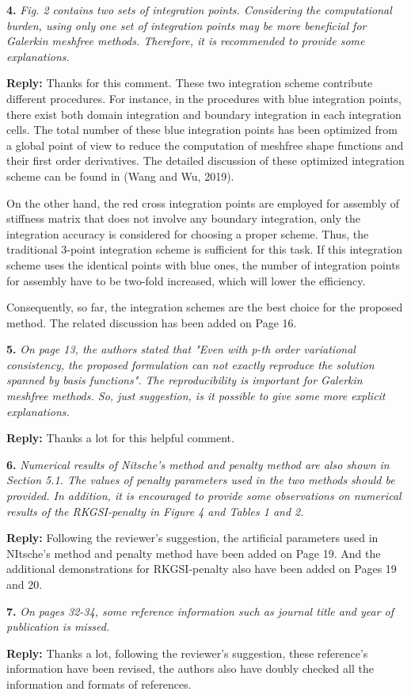 \documentclass{article}
\begin{document}
\textbf{4.} \textit{Fig. 2 contains two sets of integration points. Considering the computational burden, using only one set of integration points may be more beneficial for Galerkin meshfree methods. Therefore, it is recommended to provide some explanations.}

\textbf{Reply:} Thanks for this comment. These two integration scheme contribute different procedures. For instance, in the procedures with blue integration points, there exist both domain integration and boundary integration in each integration cells. The total number of these blue integration points has been optimized from a global point of view to reduce the computation of meshfree shape functions and their first order derivatives. The detailed discussion of these optimized integration scheme can be found in (Wang and Wu, 2019).

On the other hand, the red cross integration points are employed for assembly of stiffness matrix that does not involve any boundary integration, only the integration accuracy is considered for choosing a proper scheme. Thus, the traditional 3-point integration scheme is sufficient for this task. If this integration scheme uses the identical points with blue ones, the number of integration points for assembly have to be two-fold increased, which will lower the efficiency. 

Consequently, so far, the integration schemes are the best choice for the proposed method. The related discussion has been added on Page 16. 

\textbf{5.} \textit{On page 13, the authors stated that "Even with p-th order variational consistency, the proposed formulation can not exactly reproduce the solution spanned by basis functions". The reproducibility is important for Galerkin meshfree methods. So, just suggestion, is it possible to give some more explicit explanations.}

\textbf{Reply:} Thanks a lot for this helpful comment.

\textbf{6.} \textit{Numerical results of Nitsche's method and penalty method are also shown in Section 5.1. The values of penalty parameters used in the two methods should be provided. In addition, it is encouraged to provide some observations on numerical results of the RKGSI-penalty in Figure 4 and Tables 1 and 2.}

\textbf{Reply:} Following the reviewer's suggestion, the artificial parameters used in NItsche's method and penalty method have been added on Page 19. And the additional demonstrations for RKGSI-penalty also have been added on Pages 19 and 20. 

\textbf{7.} \textit{On pages 32-34, some reference information such as journal title and year of publication is missed.}

\textbf{Reply:} Thanks a lot, following the reviewer's suggestion, these reference's information have been revised, the authors also have doubly checked all the information and formats of references.
\end{document}

